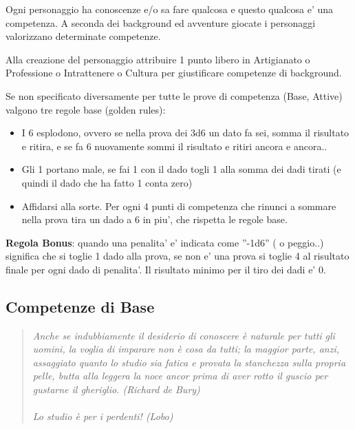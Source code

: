 \documentclass[a4paper,11pt,twoside,openany]{book}
\begin{document}
	
	Ogni personaggio ha conoscenze e/o sa fare qualcosa e questo qualcosa e' una competenza. A seconda dei background ed avventure giocate i personaggi valorizzano determinate competenze.
	
	Alla creazione del personaggio attribuire 1 punto libero in Artigianato o Professione o Intrattenere o Cultura per giustificare competenze di background.
	
	Se non specificato diversamente per tutte le prove di competenza (Base, Attive) valgono tre regole base  (golden rules):
	
	\begin{itemize}
		\item 
		I 6 esplodono, ovvero se nella prova dei 3d6 un dato fa sei, somma il risultato e ritira, e se fa 6 nuovamente sommi il risultato e ritiri ancora e ancora.. 
		\item 
		Gli 1 portano male, se fai 1 con il dado togli 1 alla somma dei dadi tirati (e quindi il dado che ha fatto 1 conta zero) 
		\item 
		Affidarsi alla sorte. Per ogni 4 punti di competenza che rinunci a sommare nella prova tira un dado a 6 in piu', che rispetta le regole base. 
	\end{itemize}
	
	\textbf{Regola Bonus}: quando una penalita' e' indicata come ''-1d6'' ( o peggio..) significa che si toglie 1 dado alla prova, se non e' una prova si toglie 4 al risultato finale per ogni dado di penalita'. Il risultato minimo per il tiro dei dadi e' 0.
	
	
	\subsection{Competenze di Base}
	
	\label{competenze-di-base}
	
	\begin{quote}\textit{
			Anche se indubbiamente il desiderio di conoscere è naturale per tutti gli uomini, la voglia di imparare non è cosa da tutti; la maggior parte, anzi, assaggiato quanto lo studio sia fatica e provata la stanchezza sulla propria pelle, butta alla leggera la noce ancor prima di aver rotto il guscio per gustarne il gheriglio. (Richard de Bury)\\\\
			Lo studio è per i perdenti! (Lobo)
	}\end{quote}
	
\end{document}
